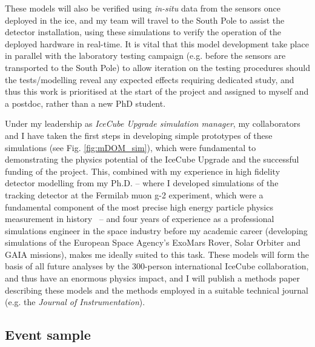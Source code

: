 \documentclass[a4paper,11pt]{article}
\begin{document}
These models will also be verified using \textit{in-situ} data from the sensors once deployed in the ice, and my team will travel to the South Pole to assist the detector installation, using these simulations to verify the operation of the deployed hardware in real-time. It is vital that this model development take place in parallel with the laboratory testing campaign (e.g. before the sensors are transported to the South Pole) to allow iteration on the testing procedures should the tests/modelling reveal any expected effects requiring dedicated study, and thus this work is prioritised at the start of the project and assigned to myself and a postdoc, rather than a new PhD student.
 
Under my leadership as \textit{IceCube Upgrade simulation manager}, my collaborators and I have taken the first steps in developing simple prototypes of these simulations (see Fig. \ref{fig:mDOM_sim}), which were fundamental to demonstrating the physics potential of the IceCube Upgrade and the successful funding of the project. This, combined with my experience in high fidelity detector modelling from my Ph.D. -- where I developed simulations of the tracking detector at the Fermilab muon g-2 experiment, which were a fundamental component of the most precise high energy particle physics measurement in history~\cite{gm2_run1_result} -- and four years of experience as a professional simulations engineer in the space industry before my academic career (developing simulations of the European Space Agency's ExoMars Rover, Solar Orbiter and GAIA missions), makes me ideally suited to this task. These models will form the basis of all future analyses by the 300-person international IceCube collaboration, and thus have an enormous physics impact,  and I will publish a methods paper describing these models and the methods employed in a suitable technical journal (e.g. the \textit{Journal of Instrumentation}). \\

\subsection{Event sample}
\label{sec:event_sample}
\end{document}
